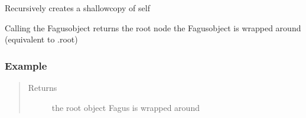 \documentclass[a4paper,10pt,english]{sphinxmanual}
\begin{document}
\begin{fulllineitems}
\begin{fulllineitems}
\label{\detokenize{fagus:fagus.Fagus.__copy__}}
\pysigstartsignatures
{}
\pysigstopsignatures
\sphinxAtStartPar
Recursively creates a shallow\sphinxhyphen{}copy of self

\end{fulllineitems}


\begin{fulllineitems}
\label{\detokenize{fagus:fagus.Fagus.__call__}}
\pysigstartsignatures
{}
\pysigstopsignatures
\sphinxAtStartPar
Calling the Fagus\sphinxhyphen{}object returns the root node the Fagus\sphinxhyphen{}object is wrapped around (equivalent to .root)
\subsubsection*{Example}

\begin{sphinxVerbatim}[commandchars=\\\{\}]
   
   
  
\end{sphinxVerbatim}
\begin{quote}\begin{description}
\item[{Returns}] \leavevmode
\sphinxAtStartPar
the root object Fagus is wrapped around


\end{description}
\end{quote}
\end{fulllineitems}
\end{fulllineitems}
\end{document}
